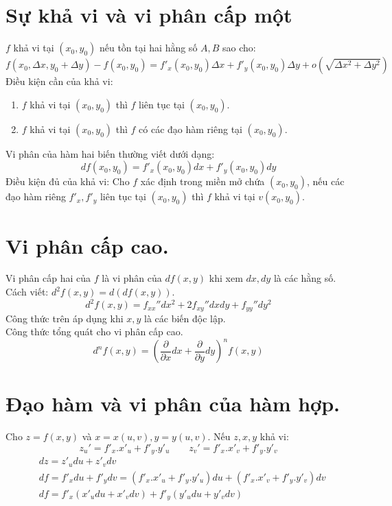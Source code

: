 \documentclass[12pt, a4paper]{report}
\begin{document}
\section{Sự khả vi và vi phân cấp một}
$f$ khả vi tại $(x_0,y_0)$ nếu tồn tại hai hằng số $A,B$ sao cho: 
\[
    f(x_0,\Delta x,y_0 + \Delta y) - f(x_0,y_0) = f'_x (x_0,y_0)\Delta x + f'_y (x_0,y_0)\Delta y + o\left( \sqrt{\Delta x^2 + \Delta y^2}\right)
\]
Điều kiện cần của khả vi: 
\begin{enumerate}
    \item $f$ khả vi tại $(x_0,y_0)$ thì $f$ liên tục tại $(x_0,y_0)$.
    \item $f$ khả vi tại $(x_0,y_0)$ thì $f$ có các đạo hàm riêng tại $(x_0,y_0)$.
\end{enumerate}
Vi phân của hàm hai biến thường viết dưới dạng:
\[
    df(x_0,y_0)=f'_x (x_0,y_0)dx + f'_y (x_0,y_0)dy    
\]
Điều kiện đủ của khả vi: Cho $f$ xác định trong miền mở chứa $(x_0,y_0)$, nếu các đạo hàm riêng $f'_x,f'_y$ liên tục tại $(x_0,y_0)$ thì $f$ khả vi tại $v(x_0,y_0)$.
\section{Vi phân cấp cao.}
Vi phân cấp hai của $f$ là vi phân của $df(x,y)$ khi xem $dx,dy$ là các hằng số. Cách viết: $d^2 f(x,y)=d(df(x,y))$.
\[
    d^2 f(x,y) = f_{xx}''dx^2 + 2f_{xy}''dxdy + f_{yy}''dy^2
\]
Công thức trên áp dụng khi $x,y$ là các biến độc lập.\\
Công thức tổng quát cho vi phân cấp cao.
\[
    d^n f(x,y) = \left( \frac{\partial}{\partial x}dx + \frac{\partial}{\partial y}dy \right)^n f(x,y)    
\]
\section{Đạo hàm và vi phân của hàm hợp.}
Cho $z = f(x,y)$ và $x=x(u,v), y=y(u,v)$. Nếu $z,x,y$ khả vi:
\[
    z_u '= f'_x.x'_u + f'_y.y'_u \qquad z_v '= f'_x.x'_v + f'_y.y'_v
\]
\[
    \begin{aligned}
        &dz = z'_u du + z'_v dv \\
        &df = f'_x du + f'_y dv = (f'_x.x'_u + f'_y.y'_u)du + (f'_x.x'_v + f'_y.y'_v)dv\\
        &df = f'_x(x'_u du + x'_v dv) + f'_y(y'_u du + y'_v dv)   
    \end{aligned}    
\]
\end{document}
